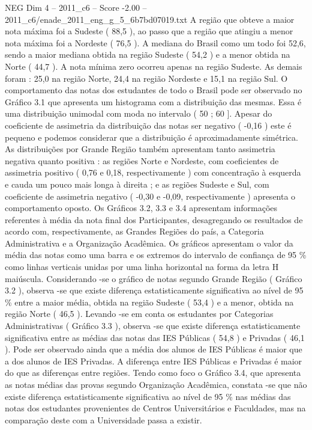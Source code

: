 \begin{textsample}{NEG Dim 4 – 2011\_c6 – Score -2.00 – 2011\_c6/enade\_2011\_eng\_g\_5\_6b7bd07019.txt}
A região que obteve a maior nota máxima foi a Sudeste ( 88,5 ), ao passo que a região que atingiu a menor nota máxima foi a Nordeste ( 76,5 ).
A mediana do Brasil como um todo foi 52,6, sendo a maior mediana obtida na região Sudeste ( 54,2 ) e a menor obtida na Norte ( 44,7 ).
A nota mínima zero ocorreu apenas na região Sudeste.
As demais foram : 25,0 na região Norte, 24,4 na região Nordeste e 15,1 na região Sul.
O comportamento das notas dos estudantes de todo o Brasil pode ser observado no Gráfico 3.1 que apresenta um histograma com a distribuição das mesmas.
Essa é uma distribuição unimodal com moda no intervalo ( 50 ; 60 ].
Apesar do coeficiente de assimetria da distribuição das notas ser negativo ( -0,16 ) este é pequeno e podemos considerar que a distribuição é aproximadamente simétrica.
As distribuições por Grande Região também apresentam tanto assimetria negativa quanto positiva : as regiões Norte e Nordeste, com coeficientes de assimetria positivo ( 0,76 e 0,18, respectivamente ) com concentração à esquerda e cauda um pouco mais longa à direita ; e as regiões Sudeste e Sul, com coeficiente de assimetria negativo ( -0,30 e -0,09, respectivamente ) apresenta o comportamento oposto.
Os Gráficos 3.2, 3.3 e 3.4 apresentam informações referentes à média da nota final dos Participantes, desagregando os resultados de acordo com, respectivamente, as Grandes Regiões do país, a Categoria Administrativa e a Organização Acadêmica.
Os gráficos apresentam o valor da média das notas como uma barra e os extremos do intervalo de confiança de 95 \% como linhas verticais unidas por uma linha horizontal na forma da letra H maiúscula.
Considerando -se o gráfico de notas segundo Grande Região ( Gráfico 3.2 ), observa -se que existe diferença estatisticamente significativa ao nível de 95 \% entre a maior média, obtida na região Sudeste ( 53,4 ) e a menor, obtida na região Norte ( 46,5 ).
Levando -se em conta os estudantes por Categorias Administrativas ( Gráfico 3.3 ), observa -se que existe diferença estatisticamente significativa entre as médias das notas das IES Públicas ( 54,8 ) e Privadas ( 46,1 ).
Pode ser observado ainda que a média dos alunos de IES Públicas é maior que a dos alunos de IES Privadas.
A diferença entre IES Públicas e Privadas é maior do que as diferenças entre regiões.
Tendo como foco o Gráfico 3.4, que apresenta as notas médias das provas segundo Organização Acadêmica, constata -se que não existe diferença estatisticamente significativa ao nível de 95 \% nas médias das notas dos estudantes provenientes de Centros Universitários e Faculdades, mas na comparação deste com a Universidade passa a existir.

\end{textsample}
